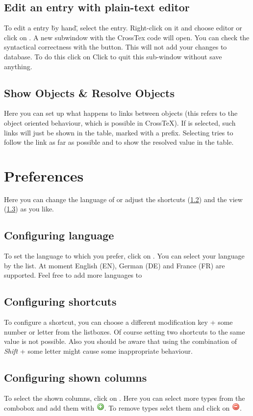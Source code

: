 \documentclass[a4paper,10pt]{scrartcl}
\begin{document}
\subsection{Edit an entry with plain-text editor} 
To edit a entry \"by hand\", select the entry. Right-click on it and choose
\editplain editor or click on \clickpath{\edit}{\editplain}. A
new subwindow with the CrossTex code will open. You can check the syntactical
correctness with the \checksyntax button. This will not add your changes to
database. To do this click on \checksave Click to \cancel quit this sub-window
without save anything.
\subsection{Show Objects \& Resolve Objects}
Here you can set up what happens to links between objects (this refers to the
object oriented behaviour, which is possible in CrossTeX).
If \showobjects is selected, such links will just be shown in the table, marked
with a \textrangle\textrangle prefix. Selecting \resolveobjects tries to follow
the link as far as possible and to show the resolved value in the table.
\section{Preferences}
Here you can change the language of \crossrefx or adjust the shortcuts
(\ref{shortcuts}) and the view (\ref{view}) as you like.
\subsection{Configuring language}
\label{language} 
To set the language to which you prefer, click on
\clickpath{\extras}{\clickpath {\preferences}{\generalpreferences}}. You can
select your language by the list. At moment English (EN), German (DE) and France
(FR) are supported. Feel free to add more languages to \crossrefx
\subsection{Configuring shortcuts}\label{shortcuts}
To configure a shortcut, you can choose a different modification key + some
number or letter from the listboxes. Of course setting two shortcuts to the same
value is not possible.
Also you should be aware that using the combination of \textit{Shift} + some
letter might cause some inappropriate behaviour.
\subsection{Configuring shown columns}\label{view}
To select the shown columns, click on
\clickpath{\extras}{\clickpath{\preferences}{\adjustview}}. Here you can select
more types from the combobox and add them with
\includegraphics{./images/add.png}. To remove types selct them and click on
\includegraphics{./images/delete.png}.
\end{document}
